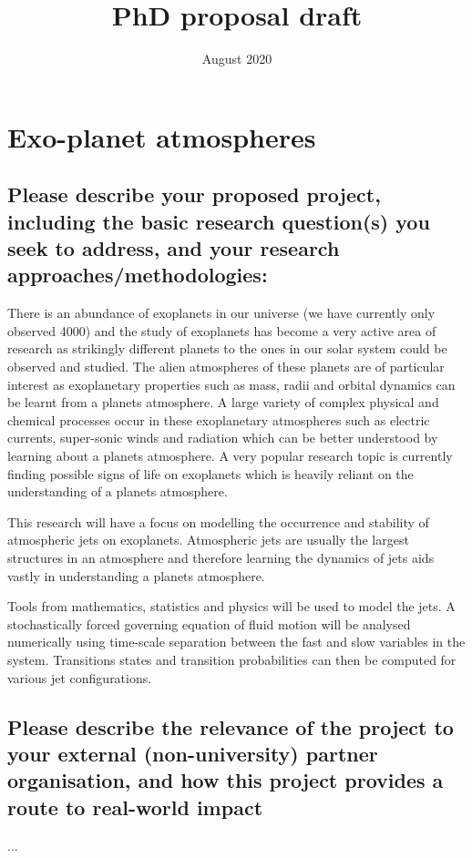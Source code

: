 \documentclass{article}
\title{PhD proposal draft}
\date{August 2020}
\begin{document}
\maketitle

\section{Exo-planet atmospheres}

\subsection{Please describe your proposed project, including the basic research question(s) you seek to address, and your research approaches/methodologies:}

There is an abundance of exoplanets in our universe (we have currently only observed 4000) and the study of exoplanets has become a very active area of research as strikingly different planets to the ones in our solar system could be observed and studied. The alien atmospheres of these planets are of particular interest as exoplanetary properties such as mass, radii and orbital dynamics can be learnt from a planets atmosphere. A large variety of complex physical and chemical processes occur in these exoplanetary atmospheres such as electric currents, super-sonic winds and radiation which can be better understood by learning about a planets atmosphere. A very popular research topic is currently finding possible signs of life on exoplanets which is heavily reliant on the understanding of a planets atmosphere.

This research will have a focus on modelling the occurrence and stability of atmospheric jets on exoplanets. Atmospheric jets are usually the largest structures in an atmosphere and therefore learning the dynamics of jets aids vastly in understanding a planets atmosphere. 

Tools from mathematics, statistics and physics will be used to model the jets. A stochastically forced governing equation of fluid motion will be analysed numerically using time-scale separation between the fast and slow variables in the system. Transitions states and transition probabilities can then be computed for various jet configurations.








\subsection{Please describe the relevance of the project to your external (non-university) partner organisation, and how this project provides a route to real-world impact}
...
\end{document}
